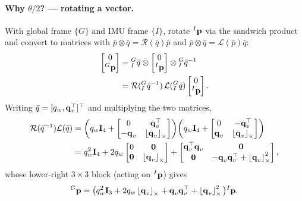 \paragraph{Why $\theta/2$? --- rotating a vector.} With global frame $\{G\}$ and IMU frame $\{I\}$, rotate ${}^{I}\boldsymbol{\mathbf{p}}$ via the sandwich product and convert to matrices with $\bar p \otimes \bar q = \mathcal{R}(\bar q)\bar p$ and $\bar p\otimes \bar q=\mathcal{L}(\bar p)\bar q$:
\begin{align}
\begin{bmatrix}0\\ {}^{G}\boldsymbol{\mathbf{p}}\end{bmatrix}
&= {}^{G}_{I}\bar{q}\otimes\begin{bmatrix}0\\ {}^{I}\boldsymbol{\mathbf{p}}\end{bmatrix}\otimes{}^{G}_{I}\bar{q}^{-1} \\
&= \mathcal{R}({}^{G}_{I}\bar{q}^{-1})\,\mathcal{L}({}^{G}_{I}\bar{q})\begin{bmatrix}0\\ {}^{I}\boldsymbol{\mathbf{p}}\end{bmatrix}.
\end{align}
Writing $\bar q = [q_w,\boldsymbol{\mathbf{q}}_v^\top]^\top$ and multiplying the two matrices,
\begin{align}
\mathcal{R}(\bar{q}^{-1})\mathcal{L}(\bar{q})
&= \left(q_w\boldsymbol{\mathbf{I}}_4 + \begin{bmatrix}0 & \boldsymbol{\mathbf{q}}_v^\top\\ -\boldsymbol{\mathbf{q}}_v & \left\lfloor\boldsymbol{\mathbf{q}}_v\right\rfloor_{\times}\end{bmatrix}\right)\!\left(q_w\boldsymbol{\mathbf{I}}_4 + \begin{bmatrix}0 & -\boldsymbol{\mathbf{q}}_v^\top\\ \boldsymbol{\mathbf{q}}_v & \left\lfloor\boldsymbol{\mathbf{q}}_v\right\rfloor_{\times}\end{bmatrix}\right) \notag\\
&= q_w^2\boldsymbol{\mathbf{I}}_4 + 2q_w\begin{bmatrix}0 & \boldsymbol{\mathbf{0}}\\ \boldsymbol{\mathbf{0}} & \left\lfloor\boldsymbol{\mathbf{q}}_v\right\rfloor_{\times}\end{bmatrix} + \begin{bmatrix}\boldsymbol{\mathbf{q}}_v^\top\boldsymbol{\mathbf{q}}_v & \boldsymbol{\mathbf{0}}\\ \boldsymbol{\mathbf{0}} & -\boldsymbol{\mathbf{q}}_v\boldsymbol{\mathbf{q}}_v^\top + \left\lfloor\boldsymbol{\mathbf{q}}_v\right\rfloor_{\times}^2\end{bmatrix},
\end{align}
whose lower-right $3\times3$ block (acting on ${}^{I}\boldsymbol{\mathbf{p}}$) gives
\begin{align}
{}^{G}\boldsymbol{\mathbf{p}} = \big(q_w^2\boldsymbol{\mathbf{I}}_3 + 2q_w\left\lfloor\boldsymbol{\mathbf{q}}_v\right\rfloor_{\times} + \boldsymbol{\mathbf{q}}_v\boldsymbol{\mathbf{q}}_v^\top + \left\lfloor\boldsymbol{\mathbf{q}}_v\right\rfloor_{\times}^2\big){}^{I}\boldsymbol{\mathbf{p}}.
\end{align}
